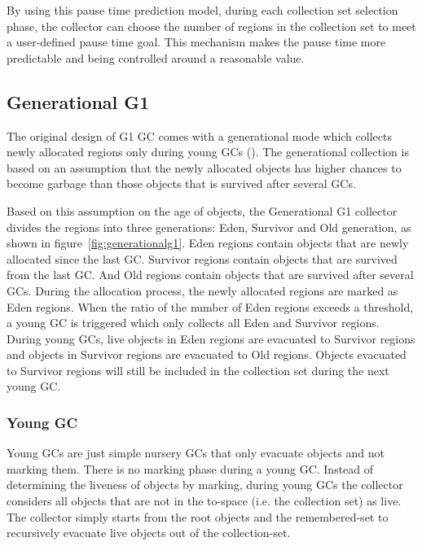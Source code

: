 By using this pause time prediction model, during each collection set selection phase,
the collector can choose the number of regions in the collection set to meet a
user-defined pause time goal. This mechanism makes the pause time more predictable
and being controlled around a reasonable value.

\subsection{Generational G1}

The original design of G1 GC comes with a generational mode which collects newly allocated regions only during young GCs (\cite{detlefs2004garbage}).
The generational collection is based on an assumption that the newly allocated objects
has higher chances to become garbage than those objects that is survived after several GCs.

Based on this assumption on the age of objects, the Generational G1 collector divides the regions into three generations: Eden, Survivor and Old generation,
as shown in figure~\ref{fig:generationalg1}.
Eden regions contain objects that are newly allocated since the last GC.
Survivor regions contain objects that are survived from the last GC.
And Old regions contain objects that are survived after several GCs.
During the allocation process, the newly allocated regions are marked as Eden regions.
When the ratio of the number of Eden regions exceeds a  threshold,
a young GC is triggered which only collects all Eden and Survivor regions.
During young GCs, live objects in Eden regions are evacuated to Survivor regions
and objects in Survivor regions are evacuated to Old regions.
Objects evacuated to Survivor regions will still be included in the collection set during the next young GC.

\begin{figure*}
  \centering
  \texttt{[image: \{figs/generational.png]}}
  \caption{Generational G1 Heap Structure}
  \label{fig:generationalg1}
\end{figure*}

\subsubsection{Young GC}

Young GCs are just simple nursery GCs that only evacuate objects and not marking them.
There is no marking phase during a young GC. Instead of determining the liveness of objects
by marking, during young GCs the collector considers all objects that are not in the
to-space (i.e. the collection set) as live. The collector simply starts from the root
objects and the remembered-set to recursively evacuate live objects out of the collection-set.

